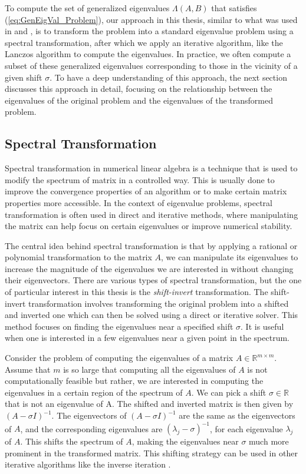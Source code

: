 To compute the set of generalized eigenvalues $\Lambda(A, B)$ that satisfies (\ref{eq:GenEigVal_Problem}), our approach in this thesis, similar to what was used in \cite{stewart2024spectraltransformationdensesymmetric} and \cite{Ericsson1980TheST}, is to transform the problem into a standard eigenvalue problem using a spectral transformation, after which we apply an iterative algorithm, like the Lanczos algorithm to compute the eigenvalues. In practice, we often compute a subset of these generalized eigenvalues corresponding to those in the vicinity of a given shift $\sigma$. To have a deep understanding of this approach, the next section discusses this approach in detail, focusing on the relationship between the eigenvalues of the original problem and the eigenvalues of the transformed problem.

\subsection{Spectral Transformation}\label{sec:SpectralTransformationDefinition}
Spectral transformation in numerical linear algebra is a technique that is used to modify the spectrum of matrix in a controlled way. This is usually done to improve the convergence properties of an algorithm or to make certain matrix properties more accessible. In the context of eigenvalue problems, spectral transformation is often used in direct and iterative methods, where manipulating the matrix can help focus on certain eigenvalues or improve numerical stability.

The central idea behind spectral transformation is that by applying a rational or polynomial transformation to the matrix $A$, we can manipulate its eigenvalues to increase the magnitude of the eigenvalues we are interested in without changing their eigenvectors. There are various types of spectral transformation, but the one of particular interest in this thesis is the \textit{shift-invert} transformation. The shift-invert transformation involves transforming the original problem into a shifted and inverted one which can then be solved using a direct or iterative solver. This method focuses on finding the eigenvalues near a specified shift $\sigma$. It is useful when one is interested in a few eigenvalues near a given point in the spectrum.

Consider the problem of computing the eigenvalues of a matrix $A \in \mathbb{R}^{m \times m}$. Assume that $m$ is so large that computing all the eigenvalues of $A$ is not computationally feasible but rather, we are interested in computing the eigenvalues in a certain region of the spectrum of $A$. We can pick a shift $\sigma \in \mathbb{R}$ that is not an eigenvalue of A. The shifted and inverted matrix is then given by $(A - \sigma I)^{-1}$. The eigenvectors of $(A - \sigma I)^{-1}$ are the same as the eigenvectors of $A$, and the corresponding eigenvalues are $(\lambda_j - \sigma)^{-1}$, for each eigenvalue $\lambda_j$ of $A$. This shifts the spectrum of $A$, making the eigenvalues near $\sigma$ much more prominent in the transformed matrix. This shifting strategy can be used in other iterative algorithms like the inverse iteration \cite{doi:10.1137/1.9781611977165}.

